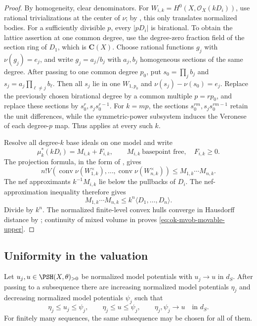 \begin{proof}
By homogeneity, clear denominators.  For
\(W_{i,k}=H^0(X,\mathcal O_X(kD_i))\), use rational trivializations at the
center of \(\nu\); by , this only
translates normalized bodies.  For a sufficiently divisible \(p\), every
\(|pD_i|\) is birational.  To obtain the lattice assertion at one common
degree, use the degree-zero fraction field of the section ring of \(D_1\),
which is \(\mathbf C(X)\).  Choose rational functions \(g_j\) with
\(\nu(g_j)=e_j\), and write \(g_j=a_j/b_j\) with \(a_j,b_j\) homogeneous
sections of the same degree.  After passing to one common degree \(p_0\), put
\(s_0=\prod_jb_j\) and
\(s_j=a_j\prod_{\ell\ne j}b_\ell\).  Then all \(s_j\) lie in one
\(W_{1,p_0}\) and \(\nu(s_j)-\nu(s_0)=e_j\).  Replace the previously chosen
birational degree by a common multiple \(p=rp_0\), and replace these sections by
\(s_0^r,s_js_0^{r-1}\).  For \(k=mp\), the sections
\(s_0^{rm},s_js_0^{rm-1}\) retain the unit differences, while the
symmetric-power subsystem induces the Veronese of each degree-\(p\) map.
Thus  applies at every such \(k\).

Resolve all degree-\(k\) base ideals on one model and write
\[
 \mu_k^*(kD_i)=M_{i,k}+F_{i,k},\qquad
 M_{i,k}\ \text{basepoint free},\quad F_{i,k}\geq0.
\]
The projection formula, in the form of , gives
\[
 n!V(\operatorname{conv}\nu(W_{1,k}^\times),\ldots,
      \operatorname{conv}\nu(W_{n,k}^\times))
 \leq M_{1,k}\cdots M_{n,k}.
\]
The nef approximants \(k^{-1}M_{i,k}\) lie below the pullbacks of \(D_i\).
The nef-approximation inequality
\cite[Propositions~2.12 and~2.13]{BFJ09} therefore gives
\[
 M_{1,k}\cdots M_{n,k}
 \leq k^n\langle D_1,\ldots,D_n\rangle.
\]
Divide by \(k^n\).  The normalized finite-level convex hulls converge in
Hausdorff distance by \cite[Proposition~10.3.4]{XiaBook}; continuity of
mixed volume in  proves
\eqref{eq:ok-mvob-movable-upper}.
\end{proof}

\subsection{Uniformity in the valuation}

\begin{lemma}\label{lem:ok-mvob-potential-sandwich}
Let \(u_j,u\in\PSH(X,\theta)_{>0}\) be normalized model potentials with
\(u_j\to u\) in \(d_S\).  After passing to a subsequence there are
increasing normalized model potentials \(\eta_j\) and decreasing normalized
model potentials \(\psi_j\) such that
\[
 \eta_j\leq u_j\leq\psi_j,\qquad
 \eta_j\leq u\leq\psi_j,\qquad
 \eta_j,\psi_j\longrightarrow u\quad\text{in }d_S.
\tag{55.37}\label{eq:ok-mvob-potential-sandwich}
\]
For finitely many sequences, the same subsequence may be chosen for all of
them.
\end{lemma}

